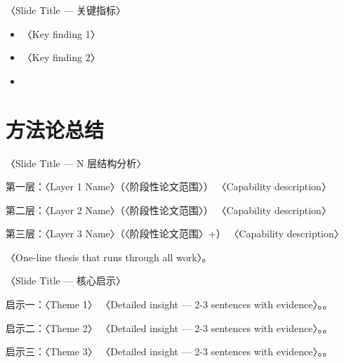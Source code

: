 \begin{frame}{〈Slide Title — 关键指标〉}
  \begin{itemize}
    \item 〈Key finding 1〉
    \item 〈Key finding 2〉
    \item {}
  \end{itemize}
  \tightgap
  \centering
  \hfill
  \hfill
\end{frame}

\renewcommand{\secblurb}{〈本节一句话主旨：从整个研究体系中提炼出的方法论启示〉}
\section{方法论总结}

\begin{frame}{〈Slide Title — N 层结构分析〉}
  \begin{block}{第一层：〈Layer 1 Name〉（〈阶段性论文范围〉）}
    〈Capability description〉\hfill {}
  \end{block}
  \tightgap
  \begin{block}{第二层：〈Layer 2 Name〉（〈阶段性论文范围〉）}
    〈Capability description〉\hfill {}
  \end{block}
  \tightgap
  \begin{block}{第三层：〈Layer 3 Name〉（〈阶段性论文范围〉+）}
    〈Capability description〉\hfill {}
  \end{block}
  \tightgap
  \begin{callout}
    〈One-line thesis that runs through all work〉。
  \end{callout}
\end{frame}

\begin{frame}{〈Slide Title — 核心启示〉}
  \begin{block}{启示一：〈Theme 1〉}
    〈Detailed insight — 2-3 sentences with evidence〉。。
  \end{block}
  \tightgap
  \begin{block}{启示二：〈Theme 2〉}
    〈Detailed insight — 2-3 sentences with evidence〉。。
  \end{block}
  \tightgap
  \begin{block}{启示三：〈Theme 3〉}
    〈Detailed insight — 2-3 sentences with evidence〉。。
  \end{block}
\end{frame}


